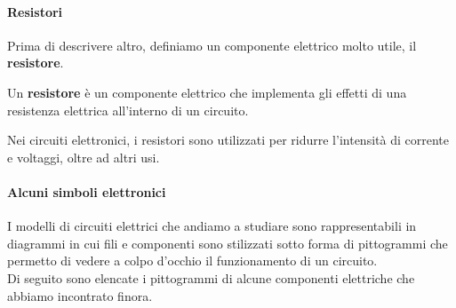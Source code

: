 \paragraph{Resistori}
Prima di descrivere altro, definiamo un componente elettrico molto utile, il \textbf{resistore}.
\begin{define}[Resistore]
	Un \textbf{resistore} è un componente elettrico che implementa gli effetti di una resistenza elettrica all'interno di un circuito. 
\end{define}
Nei circuiti elettronici, i resistori sono utilizzati per ridurre l'intensità di corrente e voltaggi, oltre ad altri usi.
\paragraph{Alcuni simboli elettronici}
I modelli di circuiti elettrici che andiamo a studiare sono rappresentabili in diagrammi in cui fili e componenti sono stilizzati sotto forma di pittogrammi che permetto di vedere a colpo d'occhio il funzionamento di un circuito.\\
Di seguito sono elencate i pittogrammi di alcune componenti elettriche che abbiamo incontrato finora.
